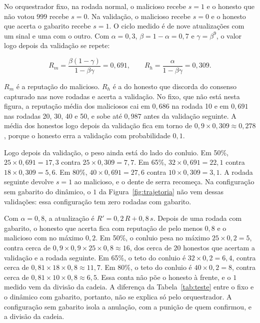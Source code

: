 \documentclass[12pt]{article}
\begin{document}
No orquestrador fixo, na rodada normal, o malicioso recebe $s=1$ e o honesto que não votou $999$ recebe $s=0$. Na validação, o malicioso recebe $s=0$ e o honesto que acerta o gabarito recebe $s=1$. O ciclo medido é de nove atualizações com um sinal e uma com o outro. Com $\alpha = 0{,}3$, $\beta = 1-\alpha = 0{,}7$ e $\gamma = \beta^{9}$, o valor logo depois da validação se repete:

\begin{equation}
\label{eq:ponto-fixo}
R_{m} = \frac{\beta(1-\gamma)}{1-\beta\gamma} = 0{,}691,
\qquad
R_{h} = \frac{\alpha}{1-\beta\gamma} = 0{,}309.
\end{equation}

$R_{m}$ é a reputação do malicioso. $R_{h}$ é a do honesto que discorda do consenso capturado nas nove rodadas e acerta a validação. No fixo, que não está nesta figura, a reputação média dos maliciosos cai em $0{,}686$ na rodada 10 e em $0{,}691$ nas rodadas 20, 30, 40 e 50, e sobe até $0{,}987$ antes da validação seguinte. A média dos honestos logo depois da validação fica em torno de $0{,}9 \times 0{,}309 \approx 0{,}278$, porque o honesto erra a validação com probabilidade $0{,}1$.

Logo depois da validação, o peso ainda está do lado do conluio. Em 50\%, $25 \times 0{,}691 = 17{,}3$ contra $25 \times 0{,}309 = 7{,}7$. Em 65\%, $32 \times 0{,}691 = 22{,}1$ contra $18 \times 0{,}309 = 5{,}6$. Em 80\%, $40 \times 0{,}691 = 27{,}6$ contra $10 \times 0{,}309 = 3{,}1$. A rodada seguinte devolve $s=1$ ao malicioso, e o dente de serra recomeça. Na configuração sem gabarito do dinâmico, o $1$ da Figura~\ref{fig:trajetoria} não vem dessas validações: essa configuração tem zero rodadas com gabarito.

Com $\alpha = 0{,}8$, a atualização é $R' = 0{,}2\,R + 0{,}8\,s$. Depois de uma rodada com gabarito, o honesto que acerta fica com reputação de pelo menos $0{,}8$ e o malicioso com no máximo $0{,}2$. Em 50\%, o conluio pesa no máximo $25 \times 0{,}2 = 5$, contra cerca de $0{,}9 \times 0{,}9 \times 25 \times 0{,}8 \approx 16$, dos cerca de 20 honestos que acertam a validação e a rodada seguinte. Em 65\%, o teto do conluio é $32 \times 0{,}2 = 6{,}4$, contra cerca de $0{,}81 \times 18 \times 0{,}8 \approx 11{,}7$. Em 80\%, o teto do conluio é $40 \times 0{,}2 = 8$, contra cerca de $0{,}81 \times 10 \times 0{,}8 \approx 6{,}5$. Essa conta não põe o honesto à frente, e o $1$ medido vem da divisão da cadeia. A diferença da Tabela~\ref{tab:teste} entre o fixo e o dinâmico com gabarito, portanto, não se explica só pelo orquestrador. A configuração sem gabarito isola a anulação, com a punição de quem confirmou, e a divisão da cadeia.
\end{document}
